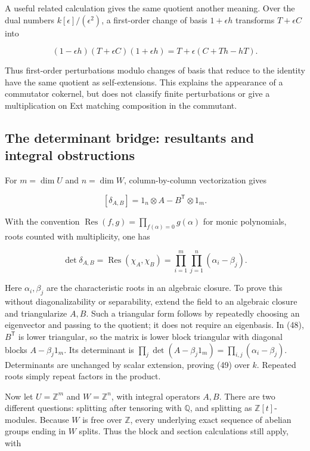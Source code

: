 \documentclass[
  11pt,
]{article}
\begin{document}
A useful related calculation gives the same quotient another meaning.
Over the dual numbers \(k[\epsilon]/(\epsilon^2)\), a first-order change
of basis \(1+\epsilon h\) transforms \(T+\epsilon C\) into

\[(1-\epsilon h)(T+\epsilon C)(1+\epsilon h)
=T+\epsilon(C+Th-hT).\tag{47}\]

Thus first-order perturbations modulo changes of basis that reduce to
the identity have the same quotient as self-extensions. This explains
the appearance of a commutator cokernel, but does not classify finite
perturbations or give a multiplication on Ext matching composition in
the commutant.

\subsection{The determinant bridge: resultants and integral
obstructions}\label{the-determinant-bridge-resultants-and-integral-obstructions}

For \(m=\dim U\) and \(n=\dim W\), column-by-column vectorization gives

\[[\delta_{A,B}]=1_n\otimes A-B^{\mathsf T}\otimes1_m.\tag{48}\]

With the convention
\(\operatorname{Res}(f,g)=\prod_{f(\alpha)=0}g(\alpha)\) for monic
polynomials, roots counted with multiplicity, one has

\[\boxed{\det\delta_{A,B}
=\operatorname{Res}(\chi_A,\chi_B)
=\prod_{i=1}^m\prod_{j=1}^n(\alpha_i-\beta_j).}\tag{49}\]

Here \(\alpha_i,\beta_j\) are the characteristic roots in an algebraic
closure. To prove this without diagonalizability or separability, extend
the field to an algebraic closure and triangularize \(A,B\). Such a
triangular form follows by repeatedly choosing an eigenvector and
passing to the quotient; it does not require an eigenbasis. In (48),
\(B^{\mathsf T}\) is lower triangular, so the matrix is lower block
triangular with diagonal blocks \(A-\beta_j1_m\). Its determinant is
\(\prod_j\det(A-\beta_j1_m)=\prod_{i,j}(\alpha_i-\beta_j)\).
Determinants are unchanged by scalar extension, proving (49) over \(k\).
Repeated roots simply repeat factors in the product.

Now let \(U=\mathbb Z^m\) and \(W=\mathbb Z^n\), with integral operators
\(A,B\). There are two different questions: splitting after tensoring
with \(\mathbb Q\), and splitting as \(\mathbb Z[t]\)-modules. Because
\(W\) is free over \(\mathbb Z\), every underlying exact sequence of
abelian groups ending in \(W\) splits. Thus the block and section
calculations still apply, with
\end{document}
